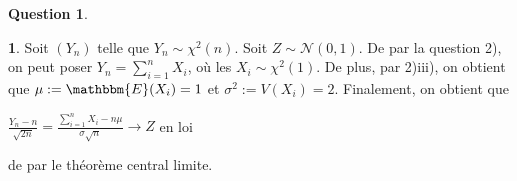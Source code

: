 \documentclass[12pt]{article}
\newcommand{\1}{\mathbbm{1}}
\newcommand{\E}{\mathbbm{E}}
\newcommand{\Nc}{\mathcal{N}}
\theoremstyle{definition}\newtheorem{defn}{Définition}
\theoremstyle{definition}\newtheorem{exm}{Exemple}
\theoremstyle{definition}\newtheorem{rem}{Remarque}
\theoremstyle{definition}\newtheorem{algo}{Algorithme}
\theoremstyle{remark}\newtheorem{exo}{Exercice}
\theoremstyle{remark}\newtheorem{nota}{Notation}
\theoremstyle{definition}\newtheorem{1q}{Question}
\theoremstyle{definition}\newtheorem{2q}{Question}
\theoremstyle{definition}\newtheorem{3q}{Question}
\theoremstyle{definition}\newtheorem{4q}{Question}
\theoremstyle{definition}\newtheorem{2qs1}{}
\theoremstyle{definition}\newtheorem{2qs2}{}
\theoremstyle{definition}\newtheorem{2qs3}{}
\theoremstyle{definition}\newtheorem{2qs4}{}
\theoremstyle{definition}\newtheorem{4qs2}{}
\theoremstyle{definition}\newtheorem{4qs3}{}
\begin{document}
\begin{2q}
\begin{2qs3}
Soit $(Y_n)$ telle que $Y_n\sim \chi^2(n)$. Soit $Z\sim\Nc(0,1)$.\newline
De par la question 2), on peut poser $Y_n = \displaystyle\sum_{i=1}^nX_i$, où les $X_i\sim \chi^2(1)$.\newline
De plus, par 2)iii), on obtient que $\mu:=\E(X_i)=1$ et $\sigma^2 := V(X_i)=2$.\newline
Finalement, on obtient que 
\begin{center}$\displaystyle \frac{Y_n - n}{\sqrt{2n}} = \frac{\sum_{i=1}^n X_i - n\mu}{\sigma\sqrt{n}}\longrightarrow Z$ en loi\end{center}
de par le théorème central limite.
\end{2qs3}
\end{2q}
\end{document}
